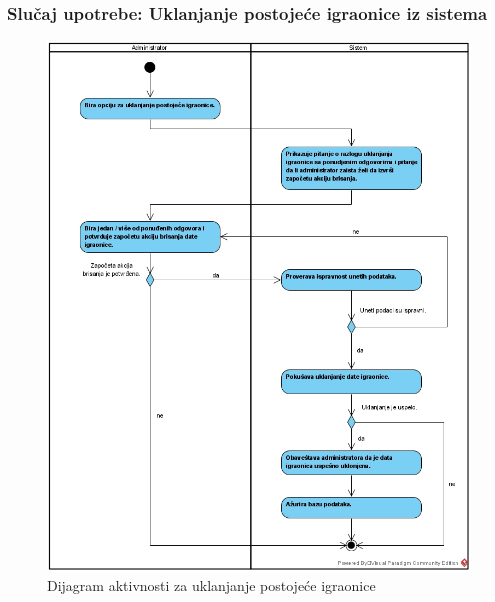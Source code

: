 \documentclass[a4paper]{article}
\begin{document}
\subsubsection{Slučaj upotrebe: Uklanjanje postojeće igraonice iz sistema}

\begin{figure}[!ht]
\begin{center}
\includegraphics[scale=0.55]{sections/images/dijagram_aktivnosti_uklanjanje_postojece_igraonice.jpg}
\end{center}
\caption{Dijagram aktivnosti za uklanjanje postojeće igraonice}
\label{fig:kontekst}
\end{figure}
\end{document}

